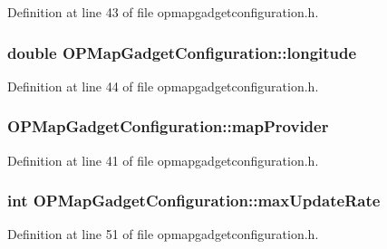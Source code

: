 \-Definition at line 43 of file opmapgadgetconfiguration.\-h.

\hypertarget{group___o_p_map_plugin_ga7832a8e775f6e51898ad0075b150ccd5}{
\subsubsection[{longitude}]{\setlength{\rightskip}{0pt plus 5cm}double {\bf \-O\-P\-Map\-Gadget\-Configuration\-::longitude}}}\label{group___o_p_map_plugin_ga7832a8e775f6e51898ad0075b150ccd5}


\-Definition at line 44 of file opmapgadgetconfiguration.\-h.

\hypertarget{group___o_p_map_plugin_ga6796d346f4d9edbe710a92a987f88659}{
\subsubsection[{map\-Provider}]{ {\bf \-O\-P\-Map\-Gadget\-Configuration\-::map\-Provider}}}\label{group___o_p_map_plugin_ga6796d346f4d9edbe710a92a987f88659}


\-Definition at line 41 of file opmapgadgetconfiguration.\-h.

\hypertarget{group___o_p_map_plugin_ga3ab3b510f0eb2b7cd3b183275eba0be1}{
\subsubsection[{max\-Update\-Rate}]{\setlength{\rightskip}{0pt plus 5cm}int {\bf \-O\-P\-Map\-Gadget\-Configuration\-::max\-Update\-Rate}}}\label{group___o_p_map_plugin_ga3ab3b510f0eb2b7cd3b183275eba0be1}


\-Definition at line 51 of file opmapgadgetconfiguration.\-h.

